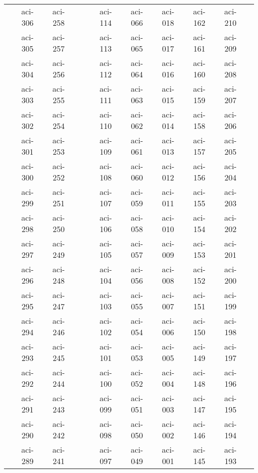 \documentclass[10pt,letterpaper]{article}
\begin{document}
\begin{center}
\begin{tabular}{ |c|c|c|c|c|c|c|c|c|c|c|}
        & aci-306 & aci-258 &                &               & aci-114 & aci-066 & aci-018 & aci-162 & aci-210 &         \\
        & aci-305 & aci-257 &                &               & aci-113 & aci-065 & aci-017 & aci-161 & aci-209 &         \\
        & aci-304 & aci-256 &                &               & aci-112 & aci-064 & aci-016 & aci-160 & aci-208 &         \\
        & aci-303 & aci-255 &                &               & aci-111 & aci-063 & aci-015 & aci-159 & aci-207 &         \\
        & aci-302 & aci-254 &                &               & aci-110 & aci-062 & aci-014 & aci-158 & aci-206 &         \\
        & aci-301 & aci-253 &                &               & aci-109 & aci-061 & aci-013 & aci-157 & aci-205 &         \\
        & aci-300 & aci-252 &                &               & aci-108 & aci-060 & aci-012 & aci-156 & aci-204 &         \\
        & aci-299 & aci-251 &                &               & aci-107 & aci-059 & aci-011 & aci-155 & aci-203 &         \\
        & aci-298 & aci-250 &                &               & aci-106 & aci-058 & aci-010 & aci-154 & aci-202 &         \\
        & aci-297 & aci-249 &                &               & aci-105 & aci-057 & aci-009 & aci-153 & aci-201 &         \\
        & aci-296 & aci-248 &                &               & aci-104 & aci-056 & aci-008 & aci-152 & aci-200 &         \\
        & aci-295 & aci-247 &                &               & aci-103 & aci-055 & aci-007 & aci-151 & aci-199 &         \\
        & aci-294 & aci-246 &                &               & aci-102 & aci-054 & aci-006 & aci-150 & aci-198 &         \\
        & aci-293 & aci-245 &                &               & aci-101 & aci-053 & aci-005 & aci-149 & aci-197 &         \\
        & aci-292 & aci-244 &                &               & aci-100 & aci-052 & aci-004 & aci-148 & aci-196 &         \\
        & aci-291 & aci-243 &                &               & aci-099 & aci-051 & aci-003 & aci-147 & aci-195 &         \\
        & aci-290 & aci-242 &                &               & aci-098 & aci-050 & aci-002 & aci-146 & aci-194 &         \\
        & aci-289 & aci-241 &                &               & aci-097 & aci-049 & aci-001 & aci-145 & aci-193 &         \\

        \hline
        \end{tabular}
        \end{center}
\end{document}
